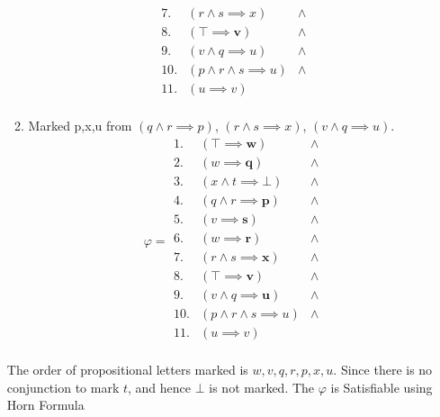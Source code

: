 \documentclass{article}
\begin{document}
\begin{enumerate}
\begin{enumerate}
\begin{displaymath}
\begin{array}{|lll}
      7.  & (r \land s \implies x)             & \land \\
      8.  & (\top \implies \textbf{v})                  & \land \\
      9.  & (v \land q \implies u)             & \land \\
      10. & (p \land r \land s \implies u)     & \land \\
      11. & (u \implies v)                     &       \\
    \end{array}
  \end{displaymath}
  \item Marked p,x,u from $(q \land r \implies p)$, $(r \land s \implies x)$, $(v \land q \implies u)$.
  \begin{displaymath}
    \varphi = 
    \begin{array}{|lll}
      1.  & (\top \implies \textbf{w})                  & \land \\
      2.  & (w \implies \textbf{q})                     & \land \\
      3.  & (x \land t \implies \bot)          & \land \\
      4.  & (q \land r \implies \textbf{p})             & \land \\
      5.  & (v \implies \textbf{s})                     & \land \\
      6.  & (w \implies \textbf{r})                     & \land \\
      7.  & (r \land s \implies \textbf{x})             & \land \\
      8.  & (\top \implies \textbf{v})                  & \land \\
      9.  & (v \land q \implies \textbf{u})             & \land \\
      10. & (p \land r \land s \implies u)     & \land \\
      11. & (u \implies v)                     &       \\
    \end{array}
  \end{displaymath}

  \end{enumerate}
  
  The order of propositional letters marked is $w, v, q, r, p, x, u$. Since there is no conjunction to mark $t$, and hence $\bot$ is not marked. The $\varphi$ is Satisfiable using Horn Formula

\end{enumerate}
\end{document}

